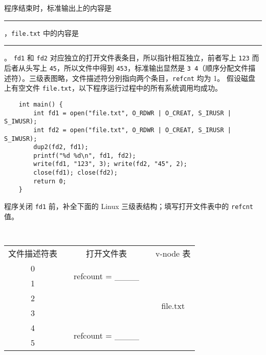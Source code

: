 \begin{problems}
\begin{table}[H]
        \end{table}
        \qn 程序结束时，标准输出上的内容是 \rule{2cm}{0.25mm}，\verb|file.txt| 中的内容是 \rule{2cm}{0.25mm}。
        \sol \verb|fd1| 和 \verb|fd2| 对应独立的打开文件表条目，所以指针相互独立，前者写上 \verb|123| 而后者从头写上 \verb|45|，所以文件中得到 \verb|453|，标准输出显然是 \verb|3 4|（顺序分配文件描述符）。三级表图略，文件描述符分别指向两个条目，\verb|refcnt| 均为 1。
        \pro 假设磁盘上有空文件 \verb|file.txt|，以下程序运行过程中的所有系统调用均成功。
        \begin{verbatim}
    int main() {
        int fd1 = open("file.txt", O_RDWR | O_CREAT, S_IRUSR | S_IWUSR); 
        int fd2 = open("file.txt", O_RDWR | O_CREAT, S_IRUSR | S_IWUSR); 
        dup2(fd2, fd1);
        printf("%d %d\n", fd1, fd2);
        write(fd1, "123", 3); write(fd2, "45", 2);
        close(fd1); close(fd2);
        return 0;
    }
        \end{verbatim}
        \qn 程序关闭 \verb|fd1| 前，补全下面的 Linux 三级表结构；填写打开文件表中的 \verb|refcnt| 值。
        \begin{table}[H]
            \tt
            \centering
            \begin{tabular}{ccccc}
                文件描述符表 & {\qquad \qquad \qquad} & 打开文件表 & {\qquad \qquad \qquad} & v-node 表 \\ \cline{1-1} \cline{3-3} \cline{5-5} 
                \multicolumn{1}{|c|}{0} & \multicolumn{1}{c|}{} & \multicolumn{1}{c|}{\multirow{2}{*}{refcount = \_\_\_\_}} & \multicolumn{1}{c|}{} & \multicolumn{1}{c|}{\multirow{6}{*}{file.txt}} \\ \cline{1-1}
                \multicolumn{1}{|c|}{1} & \multicolumn{1}{c|}{} & \multicolumn{1}{c|}{} & \multicolumn{1}{c|}{} & \multicolumn{1}{c|}{} \\ \cline{1-1} \cline{3-3}
                \multicolumn{1}{|c|}{2} &  &  & \multicolumn{1}{c|}{} & \multicolumn{1}{c|}{} \\ \cline{1-1}
                \multicolumn{1}{|c|}{3} &  &  & \multicolumn{1}{c|}{} & \multicolumn{1}{c|}{} \\ \cline{1-1} \cline{3-3}
                \multicolumn{1}{|c|}{4} & \multicolumn{1}{c|}{} & \multicolumn{1}{c|}{\multirow{2}{*}{refcount = \_\_\_\_}} & \multicolumn{1}{c|}{} & \multicolumn{1}{c|}{} \\ \cline{1-1}
                \multicolumn{1}{|c|}{5} & \multicolumn{1}{c|}{} & \multicolumn{1}{c|}{} & \multicolumn{1}{c|}{} & \multicolumn{1}{c|}{} \\ \cline{1-1} \cline{3-3} \cline{5-5} 

\end{tabular}
\end{table}
\end{problems}
